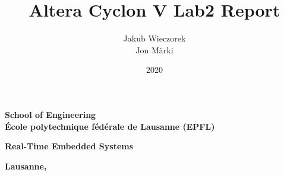 \documentclass[a4paper,titlepage,11pt,twosides,floatssmall]{mwrep}
\begin{document}
	
	\frenchspacing
	\makeatletter
	\def\ps@uheadings{%
		\let\@mkboth\markboth
		\let\ps@normal\hf@uheadings
		\let\ps@opening\hf@plain
		\let\ps@closing\hf@uheadings
		\let\ps@blank\hf@empty
		\ps@normal
		\def\chaptermark##1{%
			\markright{%
				\ifHeadingNumbered
				\thechapter.\enspace
				\fi
				##1}}}
	
	\pagestyle{uheadings}
	
	\title{\bf Altera Cyclon V Lab2 Report\vskip 0.1cm}
	\author{Jakub Wieczorek \\ Jon Märki}

	\date{2020}
	
	\makeatletter
	\renewcommand{\maketitle}{\begin{titlepage}
			\begin{center}{\LARGE {\bf
						School of Engineering}}\\
				\vspace{0.4cm}
				{\LARGE {\bf École polytechnique fédérale de Lausanne (EPFL)}}\\
				\vspace{0.3cm}
			\end{center}
			\vspace{5cm}
			\begin{center}
				{\bf \LARGE Real-Time Embedded Systems\vskip 0.1cm}
			\end{center}
			\vspace{1cm}
			\begin{center}
				{\bf \LARGE \@title}
			\end{center}
			\vspace{2cm}
			\begin{center}
				{\bf \Large \@author \par}
			\end{center}
			\vspace*{\stretch{6}}
			\begin{center}
				\bf{\large{Lausanne, \@date\vskip 0.1cm}}
			\end{center}
		\end{titlepage}
	}

	\makeatother
	
	\newcommand{\at}[2][]{#1|_{#2}}
	
	\maketitle
	
	\tableofcontents
	\setcounter{page}{2}
	

	
	\listoffigures
	\listoftables
\end{document}
